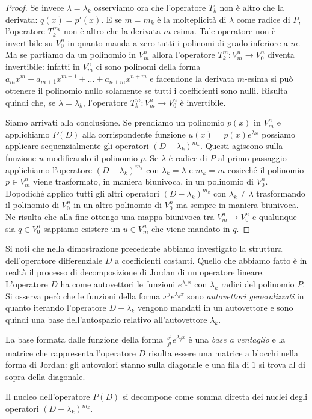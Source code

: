 \begin{proof}
Se invece $\lambda = \lambda_k$ osserviamo ora che l'operatore $T_k$ 
non è altro che la derivata: $q(x) = p'(x)$. 
E se $m=m_k$ è la molteplicità di $\lambda$ come radice di $P$, 
l'operatore $T_k^{m_k}$ non è altro che la derivata $m$-esima. 
Tale operatore non è invertibile su $V^n_0$ in quanto manda a zero tutti 
i polinomi di grado inferiore a $m$. Ma se partiamo da un polinomio in $V^n_m$ 
allora l'operatore $T_k^m\colon V^n_m \to V^n_0$ diventa invertibile: 
infatti in $V^n_m$ ci sono polinomi della forma 
$a_m x^m + a_{m+1}x^{m+1} + \dots + a_{n+m}x^{n+m}$
e facendone la derivata $m$-esima si può ottenere il polinomio nullo solamente 
se tutti i coefficienti sono nulli.
Risulta quindi che, se $\lambda = \lambda_k$, 
l'operatore $T_k^m\colon V^n_m \to V^n_0$ è invertibile.

Siamo arrivati alla conclusione. Se prendiamo un polinomio $p(x)$ in $V^n_m$ e applichiamo $P(D)$ 
alla corrispondente funzione $u(x) =p(x) e^{\lambda x}$
possiamo applicare sequenzialmente gli operatori $(D-\lambda_k)^{m_k}$. 
Questi agiscono sulla funzione $u$ modificando il polinomio $p$.
Se $\lambda$ è radice di $P$ al primo passaggio applichiamo l'operatore $(D-\lambda_k)^{m_k}$ 
con $\lambda_k=\lambda$ e $m_k=m$ cosicché il polinomio $p\in V^n_m$ viene trasformato, 
in maniera biunivoca, in un polinomio di $V^n_0$. 
Dopodiché applico tutti gli altri operatori $(D-\lambda_k)^{m_k}$ con $\lambda_k \neq \lambda$ 
trasformando il polinomio di $V^n_0$ in un altro polinomio di $V^n_0$ ma sempre in maniera biunivoca. 
Ne risulta che alla fine ottengo una mappa biunivoca tra $V^n_m \to V^n_0$ e qualunque sia 
$q\in V^n_0$ sappiamo esistere un $u\in V^n_m$ che viene mandato in $q$.
\end{proof}

\begin{remark}
Si noti che nella dimostrazione precedente abbiamo investigato la
struttura dell'operatore differenziale $D$ a coefficienti
costanti.
Quello che abbiamo fatto è in realtà il processo di
decomposizione di Jordan di un operatore lineare.
L'operatore $D$
ha come autovettori le funzioni $e^{\lambda_k x}$ con $\lambda_k$
radici del polinomio $P$.
Si osserva però che le funzioni della forma
$x^j e^{\lambda_k x}$ sono \emph{autovettori generalizzati}
in quanto iterando l'operatore $D-\lambda_k$ vengono mandati in un autovettore
e sono quindi una base dell'autospazio relativo all'autovettore
$\lambda_k$.

La base formata dalle funzione della forma $\frac{x^j}{j!} e^{\lambda_j x}$ è
una \emph{base a ventaglio} e la matrice che rappresenta l'operatore
$D$ risulta essere una matrice a blocchi nella forma di Jordan: gli
autovalori stanno sulla diagonale e una fila di $1$ si trova al di sopra della
diagonale.

Il nucleo dell'operatore $P(D)$ si decompone come somma
diretta dei nuclei degli operatori $(D-\lambda_k)^{m_k}$.
\end{remark}

